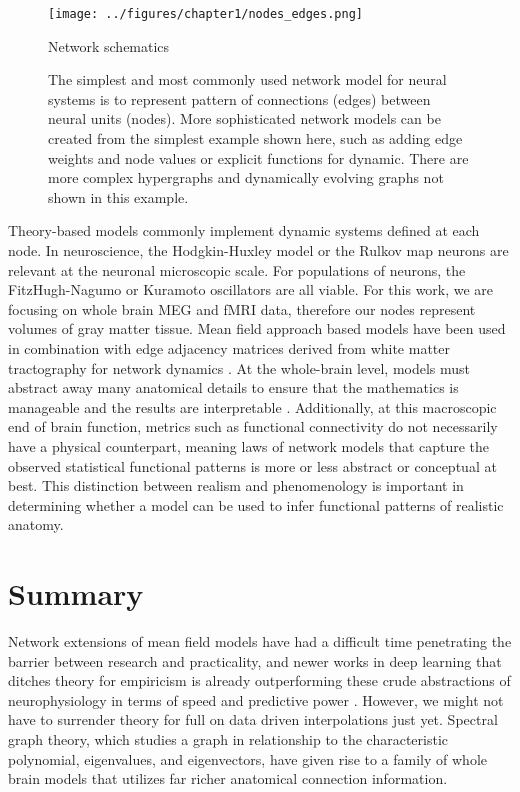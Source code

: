 \begin{figure}[htbp]
	\centering
	\texttt{[image: ../figures/chapter1/nodes\_edges.png]}
	\caption{Network schematics}
	\caption*{The simplest and most commonly used network model for neural systems is to represent pattern of connections (edges) between neural units (nodes). More sophisticated network models can be created from the simplest example shown here, such as adding edge weights and node values or explicit functions for dynamic. There are more complex hypergraphs and dynamically evolving graphs not shown in this example.}
	\label{fig:nodes-edges}
\end{figure}

Theory-based models commonly implement dynamic systems defined at each node. In neuroscience, the Hodgkin-Huxley model \cite{hodgkin_quantitative_1952} or the Rulkov map neurons \cite{zhu_effects_2016} are relevant at the neuronal microscopic scale. For populations of neurons, the FitzHugh-Nagumo \cite{acebron_noisy_2004} or Kuramoto oscillators \cite{breakspear_generative_2010} are all viable. For this work, we are focusing on whole brain MEG and fMRI data, therefore our nodes represent volumes of gray matter tissue. Mean field approach based models have been used in combination with edge adjacency matrices derived from white matter tractography for network dynamics \cite{breakspear_dynamic_2017}. At the whole-brain level, models must abstract away many anatomical details to ensure that the mathematics is manageable and the results are interpretable \cite{gerstner_theory_2012}. Additionally, at this macroscopic end of brain function, metrics such as functional connectivity do not necessarily have a physical counterpart, meaning laws of network models that capture the observed statistical functional patterns is more or less abstract or conceptual at best. This distinction between realism and phenomenology is important in determining whether a model can be used to infer functional patterns of realistic anatomy. 

\section{Summary}
Network extensions of mean field models have had a difficult time penetrating the barrier between research and practicality, and newer works in deep learning that ditches theory for empiricism is already outperforming these crude abstractions of neurophysiology in terms of speed and predictive power \cite{goncalves_training_2020,pervaiz_optimising_2020,parmar_spatiotemporal_2020}.  However, we might not have to surrender theory for full on data driven interpolations just yet. Spectral graph theory, which studies a graph in relationship to the characteristic polynomial, eigenvalues, and eigenvectors, have given rise to a family of whole brain models that utilizes far richer anatomical connection information. 

